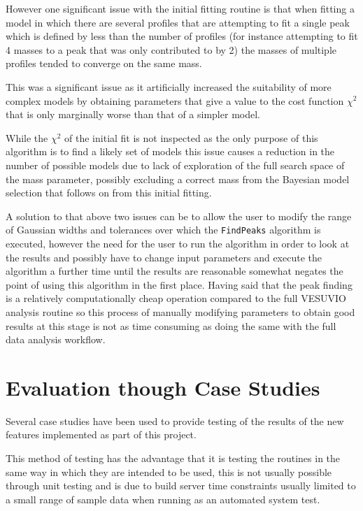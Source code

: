 \documentclass[a4paper]{article}
\begin{document}
However one significant issue with the initial fitting routine is that when
fitting a model in which there are several profiles that are attempting to fit a
single peak which is defined by less than the number of profiles (for instance
attempting to fit 4 masses to a peak that was only contributed to by 2) the
masses of multiple profiles tended to converge on the same mass.

This was a significant issue as it artificially increased the suitability of
more complex models by obtaining parameters that give a value to the cost
function $\chi^{2}$ that is only marginally worse than that of a simpler model.

While the $\chi^{2}$ of the initial fit is not inspected as the only purpose of
this algorithm is to find a likely set of models this issue causes a reduction
in the number of possible models due to lack of exploration of the full search
space of the mass parameter, possibly excluding a correct mass from the
Bayesian model selection that follows on from this initial fitting.

A solution to that above two issues can be to allow the user to modify the range
of Gaussian widths and tolerances over which the \texttt{FindPeaks} algorithm is
executed, however the need for the user to run the algorithm in order to look at
the results and possibly have to change input parameters and execute the
algorithm a further time until the results are reasonable somewhat negates the
point of using this algorithm in the first place. Having said that the peak
finding is a relatively computationally cheap operation compared to the full
VESUVIO analysis routine so this process of manually modifying parameters to
obtain good results at this stage is not as time consuming as doing the same
with the full data analysis workflow.

\section{Evaluation though Case Studies}
\label{sec:evaluation_through_case_studies}

Several case studies have been used to provide testing of the results of the new
features implemented as part of this project.

This method of testing has the advantage that it is testing the routines in the
same way in which they are intended to be used, this is not usually possible
through unit testing and is due to build server time constraints usually limited
to a small range of sample data when running as an automated system test.
\end{document}
